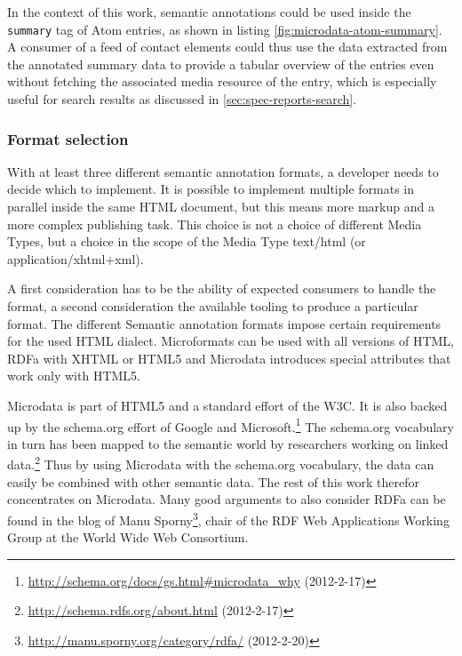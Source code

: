 \documentclass[12pt,a4paper,twoside]{scrartcl}		%
\newcommand{\citeurl}[2]{\url{#1} (#2)}
\begin{document}
In the context of this work, semantic annotations could be used inside the
\lstinline:summary: tag of Atom entries, as shown in listing
\ref{fig:microdata-atom-summary}. A consumer of a feed of contact elements could
thus use the data extracted from the annotated summary data to provide a tabular
overview of the entries even without fetching the associated media resource of
the entry, which is especially useful for search results as discussed in
\autoref{sec:spec-reports-search}.

\subsubsection{Format selection}

With at least three different semantic annotation formats, a developer needs to
decide which to implement. It is possible to implement multiple formats in
parallel inside the same HTML document, but this means more markup and a more
complex publishing task\cite{Tennison2012}. This choice is not a choice of
different Media Types, but a choice in the scope of the Media Type text/html (or
application/xhtml+xml).

A first consideration has to be the ability of expected consumers to handle the
format, a second consideration the available tooling to produce a particular
format. The different Semantic annotation formats impose certain requirements
for the used HTML dialect. Microformats can be used with all versions of HTML,
RDFa with XHTML or HTML5 and Microdata introduces special attributes that work
only with HTML5\cite{Tennison2012}.

Microdata is part of HTML5 and a standard effort of the W3C\cite{Hickson2011}.
It is also backed up by the schema.org effort of Google and
Microsoft.\footnote{\citeurl{http://schema.org/docs/gs.html\#microdata_why}{2012-2-17}}
The schema.org vocabulary in turn has been mapped to the semantic world by
researchers working on linked
data.\footnote{\citeurl{http://schema.rdfs.org/about.html}{2012-2-17}} Thus by
using Microdata with the schema.org vocabulary, the data can easily be combined
with other semantic data. The rest of this work therefor concentrates on
Microdata. Many good arguments to also consider RDFa can be found in the blog of
Manu
Sporny\footnote{\citeurl{http://manu.sporny.org/category/rdfa/}{2012-2-20}},
chair of the RDF Web Applications Working Group at the World Wide Web
Consortium.

\end{document}
